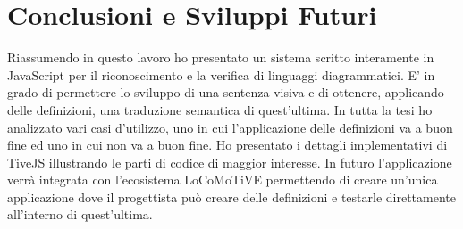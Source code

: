 \chapter{Conclusioni e Sviluppi Futuri}
    Riassumendo in questo lavoro ho presentato un sistema scritto interamente in JavaScript per il riconoscimento e la verifica di linguaggi diagrammatici. E' in grado di permettere lo sviluppo di una sentenza visiva e di ottenere, applicando delle definizioni, una traduzione semantica di quest'ultima.
    \newline
    In tutta la tesi ho analizzato vari casi d'utilizzo, uno in cui l'applicazione delle definizioni va a buon fine ed uno in cui non va a buon fine. Ho presentato i dettagli implementativi di TiveJS illustrando le parti di codice di maggior interesse.
    \newline
    In futuro l'applicazione verrà integrata con l'ecosistema LoCoMoTiVE permettendo di creare un'unica applicazione dove il progettista può creare delle definizioni e testarle direttamente all'interno di quest'ultima.